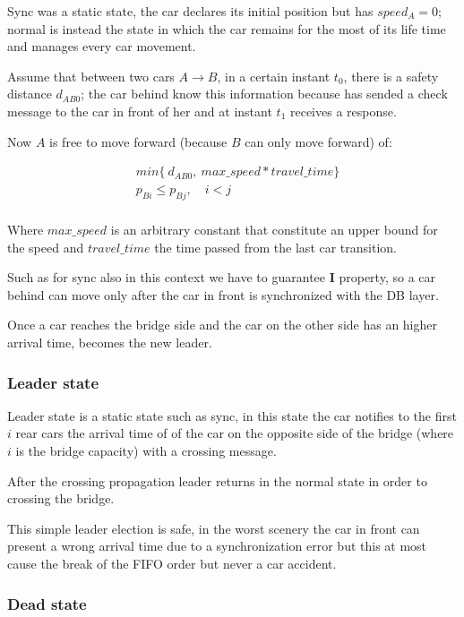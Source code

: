 Sync was a static state, the car declares its initial position but has $speed_A = 0$;
normal is instead the state in which the car remains for the most of its life time and 
manages every car movement.

Assume that between two cars $A \rightarrow B$, in a certain instant $t_0$, 
there is a safety distance $d_{AB0}$; 
the car behind know this information because has sended a check message to the car 
in front of her and at instant $t_1$ receives a response.

Now $A$ is free to move forward (because $B$ can only move forward) of:

\begin{equation}\begin{split}
    & min\{\ d_{AB0},\ max\_speed * travel\_time \} \\
    & p_{Bi} \leq p_{Bj},\quad i < j \\
\end{split}\end{equation}    

Where $max\_speed$ is an arbitrary constant that constitute an upper bound for the speed 
and $travel\_time$ the time passed from the last car transition. 

Such as for sync also in this context we have to guarantee \textbf{I} property, so 
a car behind can move only after the car in front is synchronized with the DB layer.

Once a car reaches the bridge side and the car on the other side has an 
higher arrival time, becomes the new leader.


\subsubsection{Leader state}

Leader state is a static state such as sync, in this state the car notifies to 
the first $i$ rear cars the arrival time of of the car on the opposite side of the bridge 
(where $i$ is the bridge capacity) with a crossing message.

After the crossing propagation leader returns in the normal state in order to 
crossing the bridge. 

This simple leader election is safe, in the worst scenery 
the car in front can present a wrong arrival time due to a synchronization error 
but this at most cause the break of the FIFO order but never a car accident.


\subsubsection{Dead state}

